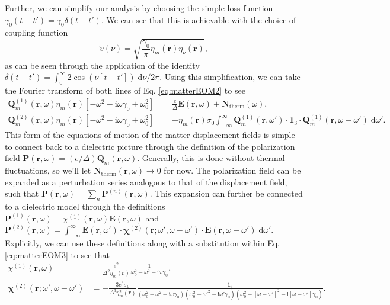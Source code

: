 \documentclass{article}
\begin{document}
Further, we can simplify our analysis by choosing the simple loss function $\gamma_0(t - t') = \gamma_0\delta(t - t')$. We can see that this is achievable with the choice of coupling function
\begin{equation}
\tilde{v}(\nu) = \sqrt{\frac{\gamma_0}{\pi}\eta_m(\mathbf{r})\eta_\nu(\mathbf{r})},
\end{equation}
as can be seen through the application of the identity $\delta(t - t') = \int_0^\infty 2\cos(\nu[t - t'])\;\mathrm{d}\nu/2\pi$. Using this simplification, we can take the Fourier transform of both lines of Eq. \eqref{eq:matterEOM2} to see
\begin{equation}\label{eq:matterEOM3}
\begin{split}
\mathbf{Q}_m^{(1)}(\mathbf{r},\omega)\eta_m(\mathbf{r})\left[-\omega^2 - \mathrm{i}\omega\gamma_0 + \omega_0^2\right] &= \frac{e}{\Delta}\mathbf{E}(\mathbf{r},\omega) + \mathbf{N}_\mathrm{therm}(\omega),\\
\mathbf{Q}_m^{(2)}(\mathbf{r},\omega)\eta_m(\mathbf{r})\left[-\omega^2 - \mathrm{i}\omega\gamma_0 + \omega_0^2\right] &= -\eta_m(\mathbf{r})\sigma_0\int_{-\infty}^\infty\mathbf{Q}_m^{(1)}(\mathbf{r},\omega')\cdot\bm{1}_3\cdot\mathbf{Q}_m^{(1)}(\mathbf{r},\omega - \omega')\;\mathrm{d}\omega'.
\end{split}
\end{equation}
This form of the equations of motion of the matter displacement fields is simple to connect back to a dielectric picture through the definition of the polarization field $\mathbf{P}(\mathbf{r},\omega) = (e/\Delta)\mathbf{Q}_m(\mathbf{r},\omega)$. Generally, this is done without thermal fluctuations, so we'll let $\mathbf{N}_\mathrm{therm}(\mathbf{r},\omega)\to0$ for now. The polarization field can be expanded as a perturbation series analogous to that of the displacement field, such that $\mathbf{P}(\mathbf{r},\omega) = \sum_n\mathbf{P}^{(n)}(\mathbf{r},\omega)$. This expansion can further be connected to a dielectric model through the definitions $\mathbf{P}^{(1)}(\mathbf{r},\omega) = \chi^{(1)}(\mathbf{r},\omega)\mathbf{E}(\mathbf{r},\omega)$ and $\mathbf{P}^{(2)}(\mathbf{r},\omega) = \int_{-\infty}^\infty\mathbf{E}(\mathbf{r},\omega')\cdot\bm{\chi}^{(2)}(\mathbf{r};\omega',\omega - \omega')\cdot\mathbf{E}(\mathbf{r},\omega - \omega')\;\mathrm{d}\omega'$. Explicitly, we can use these definitions along with a substitution within Eq. \eqref{eq:matterEOM3} to see that
\begin{equation}
\begin{split}
\chi^{(1)}(\mathbf{r},\omega) &= \frac{e^2}{\Delta^2\eta_m(\mathbf{r})}\frac{1}{\omega_0^2 - \omega^2 - \mathrm{i}\omega\gamma_0},\\
\bm{\chi}^{(2)}(\mathbf{r};\omega',\omega - \omega') &= -\frac{3e^3\sigma_0}{\Delta^3\eta_m^2(\mathbf{r})}\frac{\bm{1}_3}{(\omega_0^2 - \omega^2 - \mathrm{i}\omega\gamma_0)(\omega_0^2 - \omega'^2 - \mathrm{i}\omega'\gamma_0)(\omega_0^2 - [\omega - \omega']^2 - \mathrm{i}[\omega - \omega']\gamma_0)}.
\end{split}
\end{equation}
\end{document}

